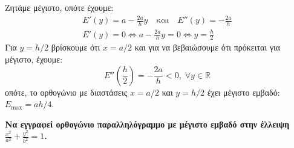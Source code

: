 \begin{solution}
Ζητάμε μέγιστο, οπότε έχουμε:
\begin{gather*}
  E'(y) = a - \frac{2a}{h} y \quad \text{και} \quad E''(y) = - \frac{2a}{h} \\
  E'(y)=0 \Leftrightarrow a - \frac{2a}{h} y = 0 \Leftrightarrow y= \frac{h}{2}
\end{gather*}
Για $ y=h/2 $ βρίσκουμε ότι $ x=a/2 $ και για να βεβαιώσουμε ότι πρόκειται για 
μέγιστο, έχουμε:
\[
  E''\left(\frac{h}{2}\right) = - \frac{2a}{h} < 0, \; \forall y \in \mathbb{R}
\] 
οπότε, το ορθογώνιο με διαστάσεις $ x=a/2 $ και $ y=h/2 $ έχει μέγιστο εμβαδό: 
$ E_{\max} = {ah}/{4}  $.
\end{solution}

\begin{exercise}
  {\bfseries \boldmath Να εγγραφεί ορθογώνιο παραλληλόγραμμο με μέγιστο εμβαδό στην
    έλλειψη $ \frac{x^{2}}{a^{2}} + \frac{y^{2}}{b^{2}} = 1 $.}
\end{exercise}
